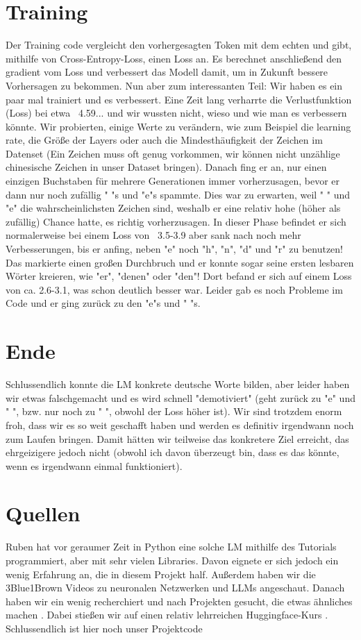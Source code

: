 \documentclass[12pt, letterpaper]{article}
\begin{document}
\section{Training}
Der Training code vergleicht den vorhergesagten Token mit dem echten und gibt, mithilfe von Cross-Entropy-Loss, einen Loss an. Es berechnet anschließend den gradient vom Loss und verbessert das Modell damit, um in Zukunft bessere Vorhersagen zu bekommen. Nun aber zum interessanten Teil: Wir haben es ein paar mal trainiert und es verbessert. Eine Zeit lang verharrte die Verlustfunktion (Loss) bei etwa ~4.59... und wir wussten nicht, wieso und wie man es verbessern könnte. Wir probierten, einige Werte zu verändern, wie zum Beispiel die learning rate, die Größe der Layers oder auch die Mindesthäufigkeit der Zeichen im Datenset (Ein Zeichen muss oft genug vorkommen, wir können nicht unzählige chinesische Zeichen in unser Dataset bringen). Danach fing er an, nur einen einzigen Buchstaben für mehrere Generationen immer vorherzusagen, bevor er dann nur noch zufällig " "s und "e"s spammte. Dies war zu erwarten, weil " " und "e" die wahrscheinlichsten Zeichen sind, weshalb er eine relativ hohe (höher als zufällig) Chance hatte, es richtig vorherzusagen. In dieser Phase befindet er sich normalerweise bei einem Loss von ~3.5-3.9 aber sank nach noch mehr Verbesserungen, bis er anfing, neben "e" noch "h", "n", "d" und "r" zu benutzen! Das markierte einen großen Durchbruch und er konnte sogar seine ersten lesbaren Wörter kreieren, wie "er", "denen" oder "den"! Dort befand er sich auf einem Loss von ca. 2.6-3.1, was schon deutlich besser war. Leider gab es noch Probleme im Code und er ging zurück zu den "e"s und " "s. 

\section{Ende}
Schlussendlich konnte die LM konkrete deutsche Worte bilden, aber leider haben wir etwas falschgemacht und es wird schnell "demotiviert" (geht zurück zu "e" und " ", bzw. nur noch zu " ", obwohl der Loss höher ist). Wir sind trotzdem enorm froh, dass wir es so weit geschafft haben und werden es definitiv irgendwann noch zum Laufen bringen. Damit hätten wir teilweise das konkretere Ziel erreicht, das ehrgeizigere jedoch nicht (obwohl ich davon überzeugt bin, dass es das könnte, wenn es irgendwann einmal funktioniert).  

\section{Quellen}
Ruben hat vor geraumer Zeit in Python eine solche LM mithilfe des Tutorials \cite{Python} programmiert, aber mit sehr vielen Libraries. Davon eignete er sich jedoch ein wenig Erfahrung an, die in diesem Projekt half. Außerdem haben wir die 3Blue1Brown Videos \cite{3B1B} zu neuronalen Netzwerken und LLMs angeschaut. Danach haben wir ein wenig recherchiert und nach Projekten gesucht, die etwas ähnliches machen \cite{Python2}. Dabei stießen wir auf einen relativ lehrreichen Huggingface-Kurs \cite{huggingface}. Schlussendlich ist hier noch unser Projektcode \cite{Repo}
\printbibliography
\end{document}
